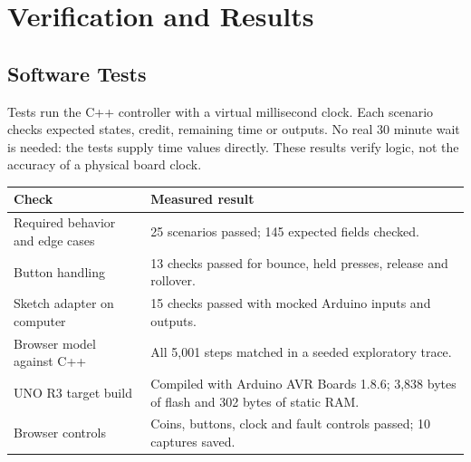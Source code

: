 \section{Verification and Results}
\subsection{Software Tests}
Tests run the C++ controller with a virtual millisecond clock. Each scenario
checks expected states, credit, remaining time or outputs. No real 30 minute
wait is needed: the tests supply time values directly. These results verify
logic, not the accuracy of a physical board clock.

\begin{tabularx}{\linewidth}{@{}p{5.4cm}Y@{}}
\toprule
Check & Measured result\\
\midrule
Required behavior and edge cases & 25 scenarios passed; 145 expected fields checked.\\
Button handling & 13 checks passed for bounce, held presses, release and rollover.\\
Sketch adapter on computer & 15 checks passed with mocked Arduino inputs and outputs.\\
Browser model against C++ & All 5,001 steps matched in a seeded exploratory trace.\\
UNO R3 target build & Compiled with Arduino AVR Boards 1.8.6; 3,838 bytes of flash and 302 bytes of static RAM.\\
Browser controls & Coins, buttons, clock and fault controls passed; 10 captures saved.\\
\bottomrule
\end{tabularx}

